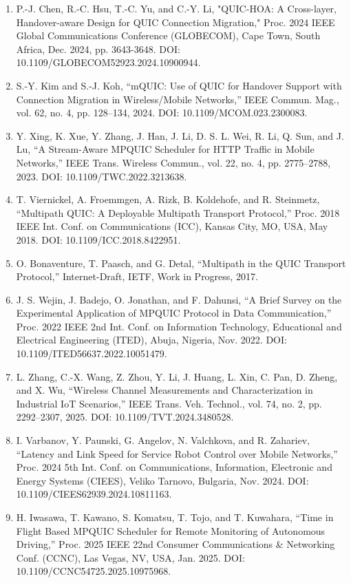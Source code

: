 \begin{enumerate}
\item
  P.-J. Chen, R.-C. Hsu, T.-C. Yu, and C.-Y. Li, "QUIC-HOA: A Cross-layer, Handover-aware Design for QUIC Connection Migration," Proc. 2024 IEEE Global Communications Conference (GLOBECOM), Cape Town, South Africa, Dec. 2024, pp. 3643-3648. DOI: 10.1109/GLOBECOM52923.2024.10900944.
\item
  S.-Y. Kim and S.-J. Koh, ``mQUIC: Use of QUIC for Handover Support with Connection Migration in Wireless/Mobile Networks,'' IEEE Commun. Mag., vol. 62, no. 4, pp. 128--134, 2024. DOI: 10.1109/MCOM.023.2300083.
\item
  Y. Xing, K. Xue, Y. Zhang, J. Han, J. Li, D. S. L. Wei, R. Li, Q. Sun, and J. Lu, ``A Stream-Aware MPQUIC Scheduler for HTTP Traffic in Mobile Networks,'' IEEE Trans. Wireless Commun., vol. 22, no. 4, pp. 2775--2788, 2023. DOI: 10.1109/TWC.2022.3213638.
\item
  T. Viernickel, A. Froemmgen, A. Rizk, B. Koldehofe, and R. Steinmetz, ``Multipath QUIC: A Deployable Multipath Transport Protocol,'' Proc. 2018 IEEE Int. Conf. on Communications (ICC), Kansas City, MO, USA, May 2018. DOI: 10.1109/ICC.2018.8422951.
\item
  O. Bonaventure, T. Paasch, and G. Detal, ``Multipath in the QUIC Transport Protocol,'' Internet-Draft, IETF, Work in Progress, 2017.
\item
  J. S. Wejin, J. Badejo, O. Jonathan, and F. Dahunsi, ``A Brief Survey on the Experimental Application of MPQUIC Protocol in Data Communication,'' Proc. 2022 IEEE 2nd Int. Conf. on Information Technology, Educational and Electrical Engineering (ITED), Abuja, Nigeria, Nov. 2022. DOI: 10.1109/ITED56637.2022.10051479.
\item
  L. Zhang, C.-X. Wang, Z. Zhou, Y. Li, J. Huang, L. Xin, C. Pan, D. Zheng, and X. Wu, ``Wireless Channel Measurements and Characterization in Industrial IoT Scenarios,'' IEEE Trans. Veh. Technol., vol. 74, no. 2, pp. 2292--2307, 2025. DOI: 10.1109/TVT.2024.3480528.
\item
  I. Varbanov, Y. Paunski, G. Angelov, N. Valchkova, and R. Zahariev, ``Latency and Link Speed for Service Robot Control over Mobile Networks,'' Proc. 2024 5th Int. Conf. on Communications, Information, Electronic and Energy Systems (CIEES), Veliko Tarnovo, Bulgaria, Nov. 2024. DOI: 10.1109/CIEES62939.2024.10811163.
\item
  H. Iwasawa, T. Kawano, S. Komatsu, T. Tojo, and T. Kuwahara, ``Time in Flight Based MPQUIC Scheduler for Remote Monitoring of Autonomous Driving,'' Proc. 2025 IEEE 22nd Consumer Communications \& Networking Conf. (CCNC), Las Vegas, NV, USA, Jan. 2025. DOI: 10.1109/CCNC54725.2025.10975968.
\end{enumerate}

\begin{quote}
\end{quote}
